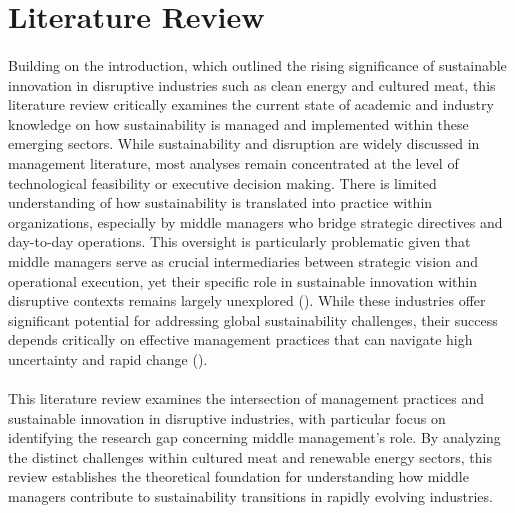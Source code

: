 	\section{Literature Review}
	\label{sec:litreview}
	
	\paragraph*{} Building on the introduction, which outlined the rising significance of sustainable innovation in disruptive industries such as clean energy and cultured meat, this literature review critically examines the current state of academic and industry knowledge on how sustainability is managed and implemented within these emerging sectors. While sustainability and disruption are widely discussed in management literature, most analyses remain concentrated at the level of technological feasibility or executive decision making. There is limited understanding of how sustainability is translated into practice within organizations, especially by middle managers who bridge strategic directives and day-to-day operations. This oversight is particularly problematic given that middle managers serve as crucial intermediaries between strategic vision and operational execution, yet their specific role in sustainable innovation within disruptive contexts remains largely unexplored (\textcite{Floyd1997}). While these industries offer significant potential for addressing global sustainability challenges, their success depends critically on effective management practices that can navigate high uncertainty and rapid change (\textcite{Christensen1997}).
	
	\paragraph*{} This literature review examines the intersection of management practices and sustainable innovation in disruptive industries, with particular focus on identifying the research gap concerning middle management’s role. By analyzing the distinct challenges within cultured meat and renewable energy sectors, this review establishes the theoretical foundation for understanding how middle managers contribute to sustainability transitions in rapidly evolving industries.
	
